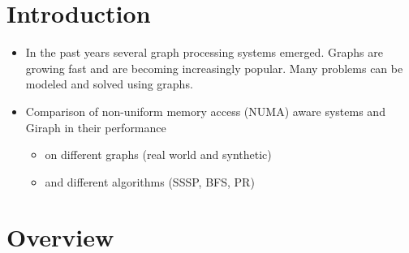 \documentclass{meetings}
\author{S. König, L. Matzner, F. Rollbühler and J. Schmid}
\date{Tuesday, 20\textsuperscript{th} October 2020}
\begin{document}
\section{Introduction}
\begin{itemize}
	\item 
In the past years several graph processing systems emerged.
Graphs are growing fast and are becoming increasingly popular. Many problems can be modeled and solved using graphs.
\item Comparison of non-uniform memory access (NUMA) aware systems and Giraph in their performance
\begin{itemize}
	\item on different graphs (real world and synthetic)
\item and different algorithms (SSSP, BFS, PR)
\end{itemize}
\end{itemize}











\clearpage
\section{Overview}


\clearpage
\end{document}
